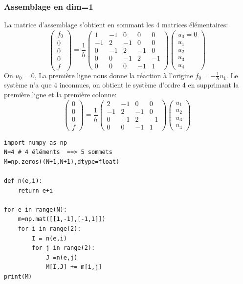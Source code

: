 \documentclass{beamer}
\begin{document}
\begin{frame}
\frametitle{Assemblage en dim=1}
La matrice d'assemblage s'obtient en sommant les 4 matrices élémentaires:
\[\left(\begin{array}{c} 
f_{0}\\0\\0\\0\\f
\end{array}\right)=\frac 1h\left(\begin{array}{ccccc} 
1&-1&0&0&0\\-1&2&-1&0&0\\
0&-1&2&-1&0\\0&0&-1&2&-1\\
0&0&0&-1&1
\end{array}\right) \left(\begin{array}{l} 
u_{0}=0\\u_{1}\\u_{2}\\u_{3}\\u_{4}
\end{array}\right)
\]
On $u_0=0$, La première ligne nous donne la réaction à l'origine $f_0=-\frac{1}{h}u_1$. Le système n'a que 4 inconnues, on obtient le système d'ordre 4 en supprimant la première ligne et la première colonne:
\[\left(\begin{array}{c} 
0\\0\\0\\f
\end{array}\right)=\frac 1h\left(\begin{array}{cccc} 
2&-1&0&0\\
-1&2&-1&0\\
0&-1&2&-1\\
0&0&-1&1
\end{array}\right) \left(\begin{array}{l} 
u_{1}\\u_{2}\\u_{3}\\u_{4}
\end{array}\right)
\]

\end{frame}
\begin{frame}[fragile]
\begin{verbatim}
import numpy as np
N=4 # 4 éléments  ==> 5 sommets
M=np.zeros((N+1,N+1),dtype=float)

def n(e,i):
    return e+i
    
for e in range(N):
    m=np.mat([[1,-1],[-1,1]])
    for i in range(2):
        I = n(e,i)
        for j in range(2):
            J =n(e,j)
            M[I,J] += m[i,j]      
print(M)
\end{verbatim}

\end{frame}
\end{document}
